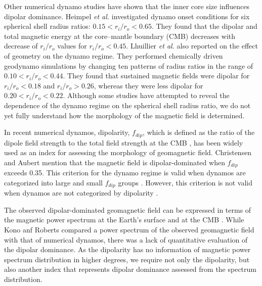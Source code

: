 Other numerical dynamo studies have shown that the inner core size influences dipolar dominance. Heimpel {\it et al.}  investigated dynamo onset conditions for six spherical shell radius ratios: $0.15 < r_{i} / r_{o} < 0.65$. They found that the dipolar and total magnetic energy at the core–mantle boundary (CMB) decreases with decrease of $r_{i} / r_{o}$ values for  $r_{i} / r_{o} < 0.45$. Lhuillier {\it et al.}  also reported on the effect of geometry on the dynamo regime. They performed chemically driven geodynamo simulations by changing ten patterns of radius ratios in the range of $0.10 < r_{i} / r_{o} < 0.44$. They found that sustained magnetic fields were dipolar for  $r_{i} / r_{o} < 0.18$ and  $r_{i} / r_{o} > 0.26$, whereas they were less dipolar for $0.20 < r_{i} / r_{o} < 0.22$. Although some studies have attempted to reveal the dependence of the dynamo regime on the spherical shell radius ratio, we do not yet fully understand how the morphology of the magnetic field is determined.

In recent numerical dynamos, dipolarity, $f_{dip}$, which is defined as the ratio of the dipole field strength to the total field strength at the CMB \cite{Uli:2006}, has been widely used as an index for assessing the morphology of geomagnetic field. Christensen and Aubert  mention that the magnetic field is dipolar-dominated when $f_{dip}$ exceeds 0.35. This criterion for the dynamo regime is valid when dynamos are categorized into large and small $f_{dip}$ groups \cite{Soderlund:2012}. However, this criterion is not valid when dynamos are not categorized by dipolarity \cite{Aubert:2009}. 

The observed dipolar-dominated geomagnetic field can be expressed in terms of the magnetic power spectrum at the Earth’s surface \cite{Lowes:1974} and at the CMB \cite{Langel:1982}. While Kono anf Roberts  compared a power  spectrum of the observed geomagnetic field with that of numerical dynamos, there was a lack of quantitative evaluation of the dipolar dominance. As the dipolarity has no information of magnetic power spectrum distribution in higher degrees, we require not only the dipolarity, but also another index that represents dipolar dominance assessed from the spectrum distribution.

